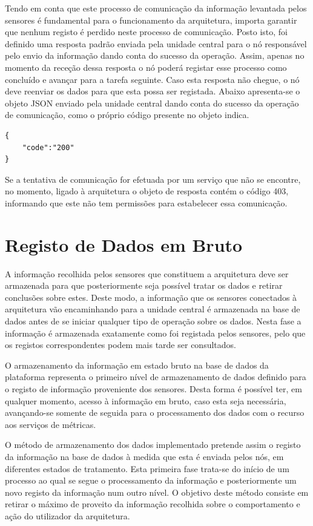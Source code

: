 Tendo em conta que este processo de comunicação da informação levantada pelos sensores é fundamental para o funcionamento da arquitetura, importa garantir que nenhum registo é perdido neste processo de comunicação. Posto isto, foi definido uma resposta padrão enviada pela unidade central para o nó responsável pelo envio da informação dando conta do sucesso da operação. Assim, apenas no momento da receção dessa resposta o nó poderá registar esse processo como concluído e avançar para a tarefa seguinte. Caso esta resposta não chegue, o nó deve reenviar os dados para que esta possa ser registada. Abaixo apresenta-se o objeto JSON enviado pela unidade central dando conta do sucesso da operação de comunicação, como o próprio código presente no objeto indica.\\

\begin{lstlisting}[caption=Mensagem de sucesso em JSON]
{
	"code":"200"
}
\end{lstlisting}


Se a tentativa de comunicação for efetuada por um serviço que não se encontre, no momento, ligado à arquitetura o objeto de resposta contém o código 403, informando que este não tem permissões para estabelecer essa comunicação.


\section{Registo de Dados em Bruto}

A informação recolhida pelos sensores que constituem a arquitetura deve ser armazenada para que posteriormente seja possível tratar os dados e retirar conclusões sobre estes. Deste modo, a informação que os sensores conectados à arquitetura vão encaminhando para a unidade central é armazenada na base de dados antes de se iniciar qualquer tipo de operação sobre os dados. Nesta fase a informação é armazenada exatamente como foi registada pelos sensores, pelo que os registos correspondentes podem mais tarde ser consultados.

O armazenamento da informação em estado bruto na base de dados da plataforma representa o primeiro nível de armazenamento de dados definido para o registo de informação proveniente dos sensores. Desta forma é possível ter, em qualquer momento, acesso à informação em bruto, caso esta seja necessária, avançando-se somente de seguida para o processamento dos dados com o recurso aos serviços de métricas. 

O método de armazenamento dos dados implementado pretende assim o registo da informação na base de dados à medida que esta é enviada pelos nós, em diferentes estados de tratamento. Esta primeira fase trata-se do início de um processo ao qual se segue o processamento da informação e posteriormente um novo registo da informação num outro nível. O objetivo deste método consiste em retirar o máximo de proveito da informação recolhida sobre o comportamento e ação do utilizador da arquitetura. 

